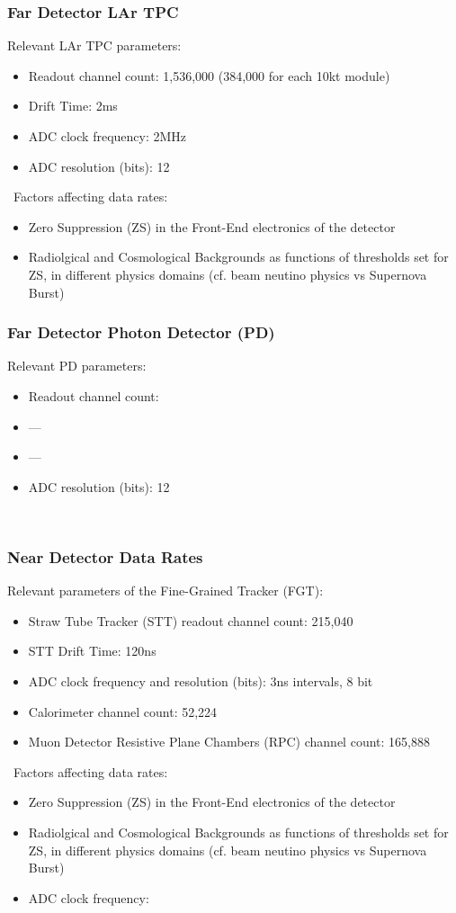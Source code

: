 \subsubsection{Far Detector LAr TPC}
Relevant  LAr TPC parameters:
\begin{itemize}
\item Readout channel count: 1,536,000 (384,000 for each 10kt module)
\item Drift Time: 2ms
\item ADC clock frequency: 2MHz
\item ADC resolution (bits): 12
\end{itemize}
\
Factors affecting data rates:
\begin{itemize}
\item Zero Suppression (ZS)  in the Front-End electronics of the detector
\item Radiolgical and Cosmological Backgrounds as functions of thresholds set for ZS, in different physics domains (cf. beam neutino physics vs Supernova Burst)
\end{itemize}

\subsubsection{Far Detector Photon Detector (PD)}
Relevant  PD parameters:
\begin{itemize}
\item Readout channel count: 
\item ---
\item ---
\item ADC resolution (bits): 12
\end{itemize}
\

\subsubsection{Near Detector Data Rates}
Relevant parameters of the Fine-Grained Tracker (FGT):
\begin{itemize}
\item   Straw Tube Tracker (STT) readout channel count: 215,040
\item STT Drift Time: 120ns
\item ADC clock frequency and resolution (bits): 3ns intervals, 8 bit
\item Calorimeter channel count: 52,224
\item Muon Detector Resistive Plane Chambers (RPC) channel count: 165,888
\end{itemize}
\
Factors affecting data rates:
\begin{itemize}
\item Zero Suppression (ZS)  in the Front-End electronics of the detector
\item Radiolgical and Cosmological Backgrounds as functions of thresholds set for ZS, in different physics domains (cf. beam neutino physics vs Supernova Burst)
\item ADC clock frequency:
\end{itemize}

